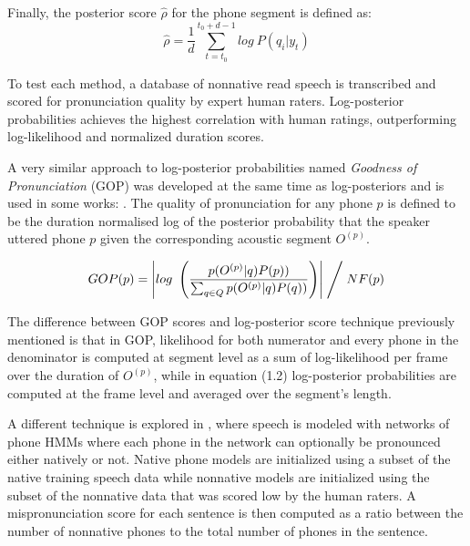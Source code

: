 Finally, the posterior score $\hat{\rho}$ for the phone segment is defined as:
\begin{equation}
\hat{\rho} = \frac{1}{d}\sum_{t=t_{0}}^{t_{0}+d-1} log \ P(q_{i}|y_{t})
\end{equation}

To test each method, a database of nonnative read speech is transcribed and scored for 
pronunciation quality by expert human raters. Log-posterior probabilities achieves the
highest correlation with human ratings, outperforming log-likelihood and normalized duration
scores.

A very similar approach to log-posterior probabilities named \textit{Goodness of Pronunciation}
(GOP) was developed at the same time as log-posteriors and
is used in some works: \cite{gop_1} \cite{gop_2} \cite{gop_3}. The quality of 
pronunciation for any phone $p$ is defined to be the duration normalised log of the posterior
probability that the speaker uttered phone $p$ given the corresponding acoustic segment
$O^{(p)}$.

\begin{equation}
GOP(p) = \left| log \ \left(\frac{p(O^{(p)}|q)P(p))}{\sum_{q \in Q}p(O^{(p)}|q)P(q))}\right) \right| \Biggm/ NF(p)
\end{equation}

The difference between GOP scores and log-posterior score technique previously mentioned 
is that in GOP, likelihood for both numerator and every phone in the denominator is
computed at segment level as a sum of log-likelihood per frame over the 
duration of $O^{(p)}$, while in equation (1.2) log-posterior probabilities are computed
at the frame level and averaged over the segment's length.

A different technique is explored in \cite{detection_mispronunciation_instruction}, where
speech is modeled with networks of phone HMMs where each phone in the network can optionally
be pronounced either natively or not. Native phone models are initialized using a subset of
the native training speech data while nonnative models are initialized using the subset of 
the nonnative data that was scored low by the human raters. A mispronunciation score for each
sentence is then computed as a ratio between the number of nonnative phones to the total 
number of phones in the sentence.

